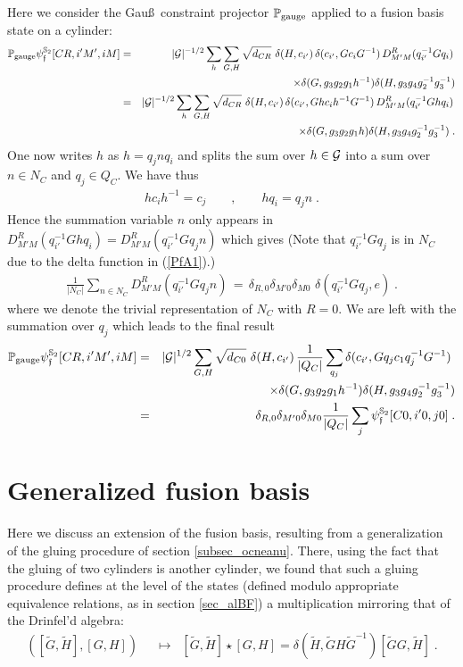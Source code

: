 \documentclass[nofootinbib,superscriptaddress,eqsecnum,tightenlines,11pt]{revtex4-1}
\def\nn{\nonumber}
\def\q{\qquad}
\def\ba{\begin{eqnarray}}
\def\ea{\end{eqnarray}}
\begin{document}
Here we consider the Gau\ss~constraint projector ${\mathbb P}_{\rm gauge}$ applied to a fusion basis state on a cylinder:
\ba\label{PfA1}
{\mathbb P}_{\rm gauge}\psi^{\mathbb{S}_2}_{\mathfrak{f}}[CR,i'M',iM]&=&
|{\cal G}|^{-1/2} \sum_{h}\sum_{G,H} \sqrt{d_{CR}}\,\, \delta(H,c_{i'}) \, \delta(c_{i'}, Gc_iG^{-1}) \, D^R_{M'M}(q^{-1}_{i'}Gq_i)\, \nn\\&&
\q\q\q \; \times \delta(G,g_3g_2g_1h^{-1}) \delta(H,g_3g_4g_2^{-1}g_3^{-1}) \nn\\
&=&
|{\cal G}|^{-1/2} \sum_{h}\sum_{G,H} \sqrt{d_{CR}}\,\, \delta(H,c_{i'}) \, \delta(c_{i'}, Gh c_ih^{-1}G^{-1}) \, D^R_{M'M}(q^{-1}_{i'}Ghq_i)\, \nn\\&&
\q\q\q \; \times  \delta(G,g_3g_2g_1h) \delta(H,g_3g_4g_2^{-1}g_3^{-1}) \;.
\ea
One now writes $h$ as $h=q_j n q_i$ and splits the sum over $h \in {\cal G}$ into a sum over $n \in N_C$ and $q_j \in Q_C$. We have thus
\ba
hc_ih^{-1}=c_j \q,\q hq_i=q_j n  \;. 
\ea
Hence the summation variable $n$ only appears in $D^R_{M'M}(q^{-1}_{i'}Ghq_i)=D^R_{M'M}(q^{-1}_{i'}Gq_j n)$ which gives (Note that $q^{-1}_{i'}Gq_j$ is in $N_C$ due to the delta function in (\ref{PfA1}).)
\ba
\frac{1}{|N_C|}\sum_{n\in N_C} D^R_{M'M}(q^{-1}_{i'}Gq_j n) \,=\, \delta_{R,0 } \delta_{M'0} \delta_{M0} 
\,\, \delta(q^{-1}_{i'}Gq_j,e )   \; .
\ea
where we denote the trivial representation of $N_C$ with $R=0$.
We are left with the summation over $q_j$ which leads to the final result
\ba
{\mathbb P}_{\rm gauge}\psi^{\mathbb{S}_2}_{\mathfrak{f}}[CR,i'M',iM]&=&
|{\cal G}|^{1/2} \sum_{G,H} \sqrt{d_{C0}}\,\, \delta(H,c_{i'}) \,    \frac{1}{|Q_C|}\sum_{q_j} \delta(c_{i'}, Gq_j c_1 q_j^{-1}G^{-1}) \, \, \nn\\&&
\q\q\; \times \delta(G,g_3g_2g_1h^{-1}) \delta(H,g_3g_4g_2^{-1}g_3^{-1})\nn\\
&=&  \delta_{R,0 } \delta_{M'0} \delta_{M0}  \frac{1}{|Q_C|}\sum_{j}\psi^{\mathbb{S}_2}_{\mathfrak{f}}[C0,i'0,j0]  \; .
\ea


\section{Generalized fusion basis\label{app_mpuncture}}

Here we discuss an extension of the fusion basis, resulting from a generalization of the gluing procedure of section \ref{subsec_ocneanu}. 
There, using the fact that the gluing of two cylinders is another cylinder, we found that such a gluing procedure defines at the level of the states (defined modulo appropriate equivalence relations, as in section \ref{sec_alBF}) a multiplication mirroring that of the Drinfel'd algebra:
\ba\label{orgalgebra}
([\widetilde{G},\widetilde{H}],[G,H])\;\; &\longmapsto \;\;[\widetilde{G},\widetilde{H}]\star [G,H] = 
	\delta(\widetilde{H},\widetilde{G}H\widetilde{G}^{-1})[\widetilde{G}G,\widetilde{H}]  \; .
\ea
\end{document}

